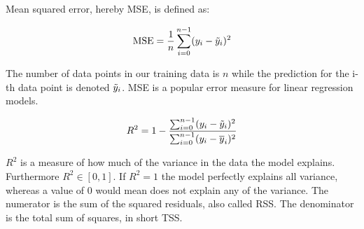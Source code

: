 Mean squared error, hereby MSE, is defined as: 

\begin{equation}\label{mse}
    \text{MSE} = \frac{1}{n}\sum_{i=0}^{n-1}(y_i-\Tilde{y}_i)^2
\end{equation}

The number of data points in our training data is $n$ while the prediction for the i-th data point is denoted $\Tilde{y}_i$. MSE is a popular  error measure for linear regression models. 

\begin{equation}
    R^2 = 1 - \frac{\sum_{i=0}^{n-1}(y_i-\Tilde{y}_i)^2}{\sum_{i=0}^{n-1}(y_i-\overline{y}_i)^2}
\end{equation}

$R^2$ is a measure of how much of the variance in the data the model explains.  Furthermore $R^2 \in [0,1]$. If $R^2 = 1$ the model perfectly explains all variance, whereas a value of 0 would mean does not explain any of the variance. The numerator is the sum of the squared residuals, also called RSS. The denominator is the total sum of squares, in short TSS. 

